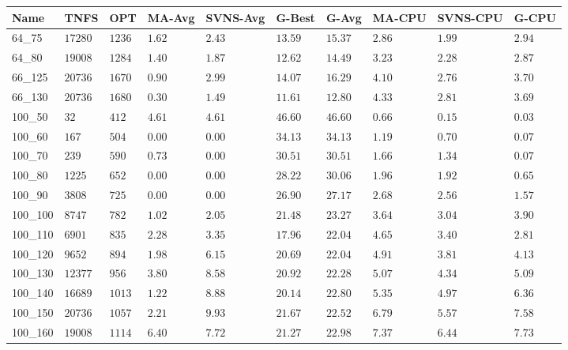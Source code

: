 \begin{center}
\begin{table}[]
\centering
\begin{tabular}{|lll|l|l|ll|lll|}
\hline
Name    & TNFS     & OPT    & MA-Avg & SVNS-Avg & G-Best & G-Avg & MA-CPU & SVNS-CPU & G-CPU \\
\hline
64\_75  & $17280$  & $1236$ & $1.62$ & $2.43$   & $13.59$ & $15.37$ & $2.86 $ & $1.99$ & $2.94$ \\
64\_80  & $19008$  & $1284$ & $1.40$ & $1.87$   & $12.62$ & $14.49$ & $3.23 $ & $2.28$ & $2.87$ \\
\hline
66\_125 & $20736$  & $1670$ & $0.90$ & $2.99$   & $14.07$ & $16.29$ & $4.10 $ & $2.76$ & $3.70$ \\
66\_130 & $20736$  & $1680$ & $0.30$ & $1.49$   & $11.61$ & $12.80$ & $4.33 $ & $2.81$ & $3.69$ \\
\hline
100\_50 & $32   $  & $412 $ & $4.61$ & $4.61$   & $46.60$ & $46.60$ & $0.66 $ & $0.15$ & $0.03$ \\
100\_60 & $167  $  & $504 $ & $\bm{0.00}$ & $\bm{0.00}$   & $34.13$ & $34.13$ & $1.19 $ & $0.70$ & $0.07$ \\
100\_70 & $239  $  & $590 $ & $0.73$ & $\bm{0.00}$   & $30.51$ & $30.51$ & $1.66 $ & $1.34$ & $0.07$ \\
100\_80 & $1225 $  & $652 $ & $\bm{0.00}$ & $\bm{0.00}$   & $28.22$ & $30.06$ & $1.96 $ & $1.92$ & $0.65$ \\
100\_90 & $3808 $  & $725 $ & $\bm{0.00}$ & $\bm{0.00}$   & $26.90$ & $27.17$ & $2.68 $ & $2.56$ & $1.57$ \\
100\_100& $8747 $  & $782 $ & $1.02$ & $2.05$   & $21.48$ & $23.27$ & $3.64 $ & $3.04$ & $3.90$ \\
100\_110& $6901 $  & $835 $ & $2.28$ & $3.35$   & $17.96$ & $22.04$ & $4.65 $ & $3.40$ & $2.81$ \\
100\_120& $9652 $  & $894 $ & $1.98$ & $6.15$   & $20.69$ & $22.04$ & $4.91 $ & $3.81$ & $4.13$ \\
100\_130& $12377$  & $956 $ & $3.80$ & $8.58$   & $20.92$ & $22.28$ & $5.07 $ & $4.34$ & $5.09$ \\
100\_140& $16689$  & $1013$ & $1.22$ & $8.88$   & $20.14$ & $22.80$ & $5.35 $ & $4.97$ & $6.36$ \\
100\_150& $20736$  & $1057$ & $2.21$ & $9.93$   & $21.67$ & $22.52$ & $6.79 $ & $5.57$ & $7.58$ \\
100\_160& $19008$  & $1114$ & $6.40$ & $7.72$   & $21.27$ & $22.98$ & $7.37 $ & $6.44$ & $7.73$ \\

\end{tabular}
\end{table}
\end{center}
